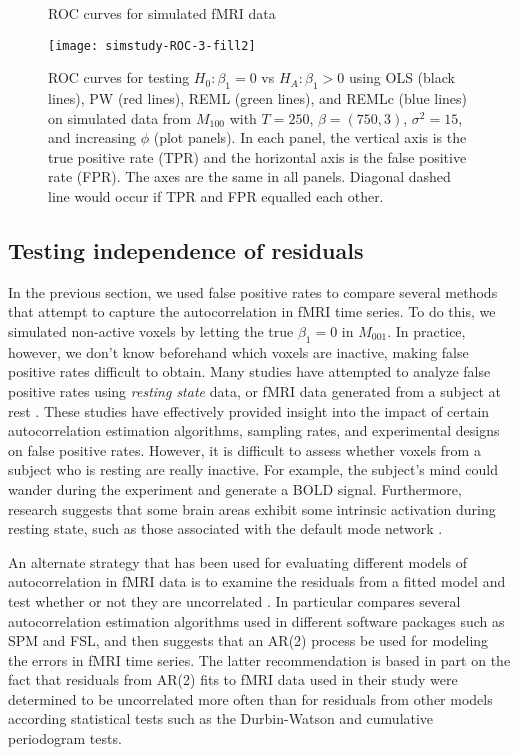 \begin{figure}
\ssp
\centering
\caption{ROC curves for simulated fMRI data} \label{fig:fmri:roc}
\texttt{[image: simstudy-ROC-3-fill2]}
\caption*{ROC curves for testing $H_0: \beta_1 = 0$ vs $H_A: \beta_1 > 0$ using OLS (black lines), PW (red lines), REML (green lines), and REMLc (blue lines) on simulated data from $M_{100}$ with $T = 250$, $\beta = (750, 3)$, $\sigma^2 = 15$, and increasing $\phi$ (plot panels). In each panel, the vertical axis is the true positive rate (TPR) and the horizontal axis is the false positive rate (FPR). The axes are the same in all panels. Diagonal dashed line would occur if TPR and FPR equalled each other.}
\end{figure}

\subsection{Testing independence of residuals \label{sec:fmri:res}}

In the previous section, we used false positive rates to compare several methods that attempt to capture the autocorrelation in fMRI time series. To do this, we simulated non-active voxels by letting the true $\beta_1 = 0$ in $M_{001}$. In practice, however, we don't know beforehand which voxels are inactive, making false positive rates difficult to obtain. Many studies have attempted to analyze false positive rates using \emph{resting state} data, or fMRI data generated from a subject at rest \citep{purdon:weiss:fpr:1998,burock:dale:fpr:2000,wool:rip:auto:2001}. These studies have effectively provided insight into the impact of certain autocorrelation estimation algorithms, sampling rates, and experimental designs on false positive rates. However, it is difficult to assess whether voxels from a subject who is resting are really inactive. For example, the subject's mind could wander during the experiment and generate a BOLD signal. Furthermore, research suggests that some brain areas exhibit some intrinsic activation during resting state, such as those associated with the default mode network \citep{grei:kras:dfmnet:2003,grei:sup:dfmnet:2009}.

An alternate strategy that has been used for evaluating different models of autocorrelation in fMRI data is to examine the residuals from a fitted model and test whether or not they are uncorrelated \citep{luo:nich:diag:2003,leonski:bax:res:2008}. In particular \citet{leonski:bax:res:2008} compares several autocorrelation estimation algorithms used in different software packages such as SPM and FSL, and then suggests that an AR(2) process be used for modeling the errors in fMRI time series. The latter recommendation is based in part on the fact that residuals from AR(2) fits to fMRI data used in their study were determined to be uncorrelated more often than for residuals from other models according statistical tests such as the Durbin-Watson and cumulative periodogram tests.

